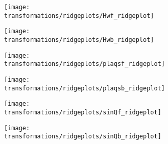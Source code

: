 \begin{figure}[htpb]
  \centering
  \begin{subfigure}{0.33\textwidth}
    \centering
    \texttt{[image: transformations/ridgeplots/Hwf\_ridgeplot]}
  \end{subfigure}
  \begin{subfigure}{0.33\textwidth}
    \texttt{[image: transformations/ridgeplots/Hwb\_ridgeplot]}
  \end{subfigure}
  \begin{subfigure}{0.33\textwidth}
    \texttt{[image: transformations/ridgeplots/plaqsf\_ridgeplot]}
  \end{subfigure}
  \begin{subfigure}{0.33\textwidth}
    \texttt{[image: transformations/ridgeplots/plaqsb\_ridgeplot]}
  \end{subfigure}
  \begin{subfigure}{0.33\textwidth}
    \texttt{[image: transformations/ridgeplots/sinQf\_ridgeplot]}
  \end{subfigure}
  \begin{subfigure}{0.33\textwidth}
    \texttt{[image: transformations/ridgeplots/sinQb\_ridgeplot]}
  \end{subfigure}
  \label{fig:sinQ_ridgeplots}
\end{figure}
